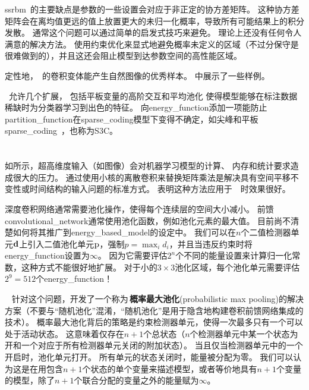 \gls{ssrbm}~的主要缺点是参数的一些设置会对应于非正定的协方差矩阵。
这种协方差矩阵会在离均值更远的值上放置更大的未归一化概率，导致所有可能结果上的积分发散。
通常这个问题可以通过简单的启发式技巧来避免。
理论上还没有任何令人满意的解决方法。
使用约束优化来显式地避免概率未定义的区域（不过分保守是很难做到的），并且这还会阻止模型到达参数空间的高性能区域。

定性地，~的卷积变体能产生自然图像的优秀样本。
中展示了一些样例。

~允许几个扩展，
包括平板变量的高阶交互和平均池化\citep{courville-al-ieee14} 使得模型能够在标注数据稀缺时为分类器学习到出色的特征。
向\gls{energy_function}添加一项能防止\gls{partition_function}在\gls{sparse_coding}模型下变得不确定，如尖峰和平板\gls{sparse_coding}~\citep{Goodfeli-et-al-TPAMI-Deep-PrePrint-2013}，也称为S3C。


\section{}
\label{sec:convolutional_boltzmann_machines}

如所示，超高维度输入（如图像）会对机器学习模型的计算、 内存和统计要求造成很大的压力。
通过使用小核的离散卷积来替换矩阵乘法是解决具有空间平移不变性或时间结构的输入问题的标准方式。
\citet{Desjardins-2008} 表明这种方法应用于~~时效果很好。

深度卷积网络通常需要池化操作，使得每个连续层的空间大小减小。
前馈\gls{convolutional_network}通常使用池化函数，例如池化元素的最大值。
目前尚不清楚如何将其推广到\gls{energy_based_model}的设定中。
我们可以在$n$个二值检测器单元$\mathbf{d}$上引入二值池化单元$\mathrm{p}$，强制$p = \max_i d_i$，并且当违反约束时将\gls{energy_function}设置为$\infty$。
因为它需要评估$2^n$个不同的能量设置来计算归一化常数，这种方式不能很好地扩展。
对于小的$3\times3$池化区域，每个池化单元需要评估$2^9 = 512$个\gls{energy_function}！


~\citet{HonglakL2009} 针对这个问题，开发了一个称为\,\textbf{概率最大池化}(probabilistic max pooling)的解决方案（不要与``随机池化''混淆，``随机池化''是用于隐含地构建卷积前馈网络集成的技术）。
概率最大池化背后的策略是约束检测器单元，使得一次最多只有一个可以处于活动状态。
这意味着仅存在$n + 1$个总状态（$n$个检测器单元中某一个状态为开和一个对应于所有检测器单元关闭的附加状态）。
当且仅当检测器单元中的一个开启时，池化单元打开。
所有单元的状态关闭时，能量被分配为零。
我们可以认为这是在用包含$n + 1$个状态的单个变量来描述模型，或者等价地具有$n + 1$个变量的模型，除了$n+1$个联合分配的变量之外的能量赋为$\infty$。

